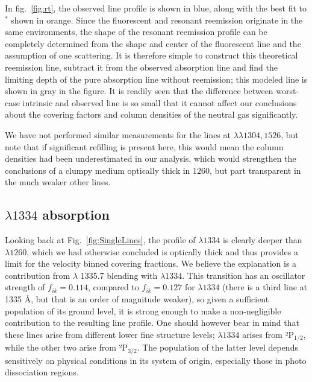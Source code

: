 \documentclass[twocolumn,]{aastex61}
\begin{document}
In fig.~\ref{fig:rt}, the observed line profile is shown in blue, along
with the best fit to $^*$ shown in orange. Since the
fluorescent and resonant reemission originate in the same environments,
the shape of the resonant reemission profile can be completely
determined from the shape and center of the fluorescent line and the
assumption of one scattering. It is therefore simple to construct this
theoretical reemission line, subtract it from the observed absorption
line and find the limiting depth of the pure absorption line without
reemission; this modeled line is shown in gray in the figure. It is
readily seen that the difference between worst-case intrinsic and
observed line is so small that it cannot affect our conclusions about
the covering factors and column densities of the neutral gas
significantly.

We have not performed similar measurements for the lines at
$\lambda \lambda 1304, 1526$, but note that if significant refilling is
present here, this would mean the column densities had been
underestimated in our analysis, which would strengthen the conclusions
of a clumpy medium optically thick in  $1260$, but part
transparent in the much weaker other lines.

\subsection{ $\lambda 1334$
absorption}\label{lambda-1334-absorption}

Looking back at Fig.~\ref{fig:SingleLines}, the profile of 
$\lambda 1334$ is clearly deeper than  $\lambda 1260$, which
we had otherwise concluded is optically thick and thus provides a limit
for the velocity binned covering fractions. We believe the explanation
is a contribution from  $\lambda$ 1335.7 blending with
$\lambda 1334$. This transition has an oscillator strength of
$f_{ik} = 0.114$, compared to $f_{ik} = 0.127$ for $\lambda 1334$ (there
is a third line at 1335 Å, but that is an order of magnitude weaker), so
given a sufficient population of its ground level, it is strong enough
to make a non-negligible contribution to the resulting line profile. One
should however bear in mind that these lines arise from different lower
fine structure levels; $\lambda 1334$ arises from ²P$_{1/2}$, while the
other two arise from ²P$_{3/2}$. The population of the latter level
depends sensitively on physical conditions in its system of origin,
especially those in photo dissociation regions.
\end{document}
